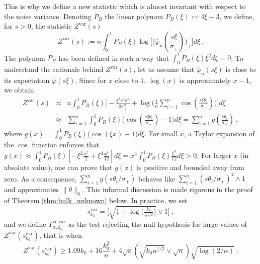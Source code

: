 \documentclass[twoside,11pt]{article}
\def\beq{\begin{equation}}
\def\eeq{\end{equation}}
\def\beqn{\begin{eqnarray*}}
\def\eeqn{\end{eqnarray*}}
\newcommand{\<}{\langle}
\renewcommand{\>}{\rangle}
\begin{document}
This is why we define a new statistic which is almost invariant with respect to the noise variance. Denoting  $P_B$ the linear polynom $P_B(\xi):= 4\xi-3$, we define, for $s>0$,  the statistic $Z^{\mathrm{var}}(s)$
\beq\label{definition_statistic}
Z^{\mathrm{var}}(s):=  n\int_0^1 P_B(\xi) \log\big[\big(\overline{\varphi}_n(\frac{s\xi}{\sigma_+})\big)_+\big]d\xi \ .
\eeq
The polynom $P_B$ has been defined in such a way that $\int_0^1 P_B(\xi)\xi^2d\xi=0$. To understand the rationale behind $Z^{\mathrm{var}}(s)$, let us assume that $\overline{\varphi}_n(s\xi)$ is close to its expectation $\overline{\varphi}(s\xi)$. Since for $x$ close to $1$, $\log(x)$ is approximately $x-1$, we obtain 
\beqn 
 Z^{\mathrm{var}}(s)&\approx& n\int_0^1 P_B(\xi) \Big[- \frac{\xi^2s^2\sigma^2}{2\sigma_+^2}+ \log\big(\frac{1}{n}\sum_{i=1}^n \cos(\frac{s\xi\theta_i}{\sigma_+}) \big)\Big]d\xi\\
 &\approx &  \sum_{i=1}^n  \int_0^1 P_B(\xi) \big(\cos(\frac{s\xi\theta_i}{\sigma_+})-1 \big)d\xi = \sum_{i=1}^n g(\frac{s\theta_i}{\sigma_+}) \ ,
\eeqn 
where  $g(x)=\int_0^1 P_B(\xi) \big(\cos(\xi x)-1 \big)d\xi$. For small $x$, a Taylor expansion of the $\cos$ function enforces that $g(x)\approx \int_0^1 P_B(\xi) [-\xi^2\tfrac{x^2}{2}+ \xi^4 \tfrac{x^4}{12}]d\xi= x^4 \int_{0}^1P_B(\xi)  \tfrac{\xi^4}{12}d\xi>0$. For larger $x$ (in absolute value), one can prove that $g(x)$ is positive and bounded away from zero. As a consequence, $\sum_{i=1}^n g(s\theta_i/\sigma_+)$ behaves like  $\sum_{i=1}^n (s\theta_i/\sigma_+)^4\wedge 1$ and approximates $\|\theta\|_0$. This informal discussion is made rigorous in the proof of Theorem \ref{thm:bulk_unknown} below.
In practice, we set 
\beq\label{eq:def_sbad}
s_{k_0}^{\mathrm{var}}=  \big[\sqrt{1+ \log\big(\tfrac{k_0}{n^{1/2}}\big)}\vee 1\big]\ , 
\eeq
and we define $T^{B,\mathrm{var}}_{\alpha,k_0}$ as the test rejecting the null hypothesis for large values of $Z^{\mathrm{var}}(s_{k_0}^{\mathrm{var}})$, that is when
\beq\label{eq:definition_Tb_alpha_ad}
Z^{\mathrm{var}}(s_{k_0}^{\mathrm{var}})\geq 1.09 k_0 + 16 \frac{k_0^2}{n }+ 4\sqrt{e} ( \sqrt{k_0n^{1/2}}\vee \sqrt{n}) \sqrt{\log(2/\alpha)}\ .
\eeq
\end{document}
